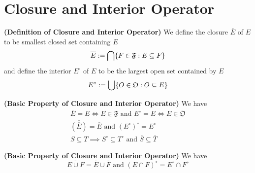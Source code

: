 \documentclass{report}
\begin{document}
\section{Closure and Interior Operator}
\begin{definition}
\label{0.2.1}
\textbf{(Definition of Closure and Interior Operator)} We define the closure $\overline{E}$ of $E$ to be smallest closed set containing $E$
\begin{equation}
  \overline{E}:=\bigcap \{ F\in\mathfrak{F}:E\subseteq F \}
\end{equation}
and define the interior $E^\circ$ of  $E$ to be the largest open set contained by  $E$ 
\begin{equation}
E^\circ :=\bigcup  \{ O\in\mathfrak{O}:O \subseteq E \}
\end{equation}
\end{definition}
\begin{theorem}
\label{0.2.2}
\textbf{(Basic Property of Closure and Interior Operator)} We have
\begin{gather}
  \overline{E}=E\iff E\in\mathfrak{F}\text{ and }E^\circ=E\iff E\in\mathfrak{O}\\
\overline{(\overline{E})}=\overline{E}\text{ and }(E^\circ)^\circ=E^\circ\\
  S\subseteq T \implies S^\circ \subseteq T^\circ\text{ and }\overline{S}\subseteq \overline{T}
\end{gather}
\end{theorem}
\begin{theorem}
\label{0.2.3}
\textbf{(Basic Property of Closure and Interior Operator)} We have 
\begin{equation}
   \overline{E\cup F}=\overline{E}\cup \overline{F}\text{ and }(E\cap F)^\circ=E^\circ \cap F^\circ
\end{equation}
\end{theorem}
\end{document}
